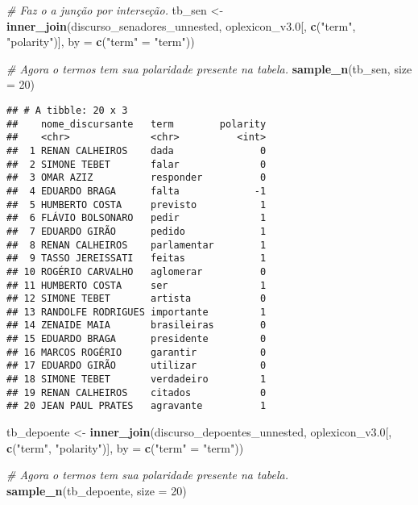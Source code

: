 \documentclass[
]{article}
\newenvironment{Shaded}{\begin{snugshade}}{\end{snugshade}}
\newcommand{\CommentTok}[1]{\textcolor[rgb]{0.56,0.35,0.01}{\textit{#1}}}
\newcommand{\DataTypeTok}[1]{\textcolor[rgb]{0.13,0.29,0.53}{#1}}
\newcommand{\DecValTok}[1]{\textcolor[rgb]{0.00,0.00,0.81}{#1}}
\newcommand{\FloatTok}[1]{\textcolor[rgb]{0.00,0.00,0.81}{#1}}
\newcommand{\KeywordTok}[1]{\textcolor[rgb]{0.13,0.29,0.53}{\textbf{#1}}}
\newcommand{\NormalTok}[1]{#1}
\newcommand{\StringTok}[1]{\textcolor[rgb]{0.31,0.60,0.02}{#1}}
\begin{document}
\begin{Shaded}
\begin{Highlighting}[]
\CommentTok{# Faz o a junção por interseção.}
\NormalTok{tb_sen <-}\StringTok{ }\KeywordTok{inner_join}\NormalTok{(discurso_senadores_unnested,}
\NormalTok{                     oplexicon_v3}\FloatTok{.0}\NormalTok{[, }\KeywordTok{c}\NormalTok{(}\StringTok{"term"}\NormalTok{, }\StringTok{"polarity"}\NormalTok{)],}
                     \DataTypeTok{by =} \KeywordTok{c}\NormalTok{(}\StringTok{"term"}\NormalTok{ =}\StringTok{ "term"}\NormalTok{))}

\CommentTok{# Agora o termos tem sua polaridade presente na tabela.}
\KeywordTok{sample_n}\NormalTok{(tb_sen, }\DataTypeTok{size =} \DecValTok{20}\NormalTok{)}
\end{Highlighting}
\end{Shaded}

\begin{verbatim}
## # A tibble: 20 x 3
##    nome_discursante   term        polarity
##    <chr>              <chr>          <int>
##  1 RENAN CALHEIROS    dada               0
##  2 SIMONE TEBET       falar              0
##  3 OMAR AZIZ          responder          0
##  4 EDUARDO BRAGA      falta             -1
##  5 HUMBERTO COSTA     previsto           1
##  6 FLÁVIO BOLSONARO   pedir              1
##  7 EDUARDO GIRÃO      pedido             1
##  8 RENAN CALHEIROS    parlamentar        1
##  9 TASSO JEREISSATI   feitas             1
## 10 ROGÉRIO CARVALHO   aglomerar          0
## 11 HUMBERTO COSTA     ser                1
## 12 SIMONE TEBET       artista            0
## 13 RANDOLFE RODRIGUES importante         1
## 14 ZENAIDE MAIA       brasileiras        0
## 15 EDUARDO BRAGA      presidente         0
## 16 MARCOS ROGÉRIO     garantir           0
## 17 EDUARDO GIRÃO      utilizar           0
## 18 SIMONE TEBET       verdadeiro         1
## 19 RENAN CALHEIROS    citados            0
## 20 JEAN PAUL PRATES   agravante          1
\end{verbatim}

\begin{Shaded}
\begin{Highlighting}[]
\NormalTok{tb_depoente <-}\StringTok{ }\KeywordTok{inner_join}\NormalTok{(discurso_depoentes_unnested,}
\NormalTok{                     oplexicon_v3}\FloatTok{.0}\NormalTok{[, }\KeywordTok{c}\NormalTok{(}\StringTok{"term"}\NormalTok{, }\StringTok{"polarity"}\NormalTok{)],}
                     \DataTypeTok{by =} \KeywordTok{c}\NormalTok{(}\StringTok{"term"}\NormalTok{ =}\StringTok{ "term"}\NormalTok{))}

\CommentTok{# Agora o termos tem sua polaridade presente na tabela.}
\KeywordTok{sample_n}\NormalTok{(tb_depoente, }\DataTypeTok{size =} \DecValTok{20}\NormalTok{)}
\end{Highlighting}
\end{Shaded}
\end{document}
